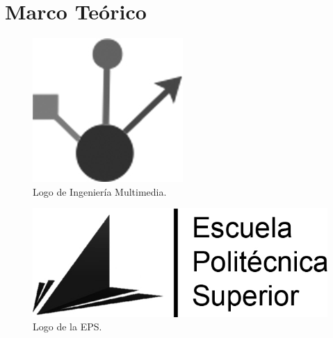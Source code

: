\chapter{Marco Teórico}
\label{marcoteorico}





\begin{figure}
\begin{center}
\includegraphics[scale=0.25]{imagenes/logoim.jpg}
\caption{Logo de Ingeniería  Multimedia.}
\label{logo_im}
\end{center}
\end{figure}

\begin{figure}
\begin{center}
\includegraphics[scale=0.25]{imagenes/logoeps.jpg}
\caption{Logo de la EPS.}
\label{logo_eps}
\end{center}
\end{figure}

